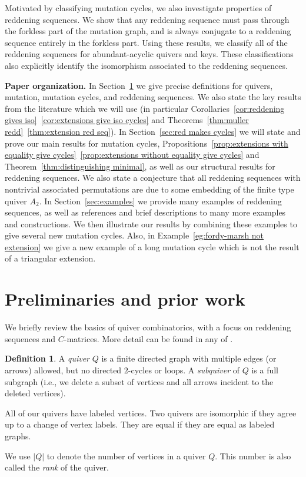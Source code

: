 \documentclass[11pt, letterpaper]{amsart}
\theoremstyle{definition}
\newtheorem{definition}[theorem]{Definition}
\numberwithin{equation}{section}
\begin{document}
Motivated by classifying mutation cycles, we also investigate properties of reddening sequences. 
We show that any reddening sequence must pass through the forkless part of the mutation graph, and is always conjugate to a reddening sequence entirely in the forkless part. 
Using these results, we classify all of the reddening sequences for abundant-acyclic quivers and keys.
These classifications also explicitly identify the isomorphism associated to the reddening sequences.

\smallskip

\noindent
\textbf{Paper organization.}
In Section~\ref{sec:prelim} we give precise definitions for quivers, mutation, mutation cycles, and reddening sequences. We also state the key results from the literature which we will use (in particular Corollaries~\ref{cor:reddening gives iso}~\ref{cor:extensions give iso cycles} and Theorems~\ref{thm:muller redd}~\ref{thm:extension red seq}).
In Section~\ref{sec:red makes cycles} we will state and prove our main results for mutation cycles, Propositions~\ref{prop:extensions with equality give cycles}~\ref{prop:extensions without equality give cycles} and Theorem~\ref{thm:distinguishing minimal}, as well as our structural results for reddening sequences.
We also state a conjecture that all reddening sequences with nontrivial associated permutations are due to some embedding of the finite type quiver $A_2$.
In Section~\ref{sec:examples} we provide many examples of reddening sequences, as well as references and brief descriptions to many more examples and constructions.
We then illustrate our results by combining these examples to give several new mutation cycles.
Also, in Example~\ref{eg:fordy-marsh not extension} we give a new example of a long mutation cycle which is not the result of a triangular extension.

\newpage
\section{Preliminaries and prior work}
\label{sec:prelim}

We briefly review the basics of quiver combinatorics, with a focus on reddening sequences and $C$-matrices.
More detail can be found in any of \cite{MR4695532, LMC, fomin2021introduction, MR3155783}. 

\begin{definition}
A \emph{quiver} $Q$ is a finite directed graph with multiple edges (or arrows) allowed, but no directed $2$-cycles or loops. 
A \emph{subquiver} of $Q$ is a full subgraph (i.e., we delete a subset of vertices and all arrows incident to the deleted vertices).

All of our quivers have labeled vertices. 
Two quivers are isomorphic if they agree up to a change of vertex labels. 
They are equal if they are equal as labeled graphs. 

We use $|Q|$ to denote the number of vertices in a quiver $Q$. This number is also called the \emph{rank} of the quiver.
\end{definition}
\end{document}
